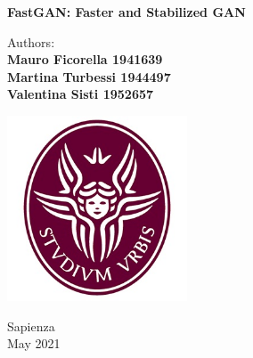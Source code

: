 \documentclass[12pt]{article}
\begin{document}
\begin{titlepage}
	\begin{center}
		\vspace*{1cm}
		
		\Huge
		\textbf{FastGAN: Faster and Stabilized GAN}
		\vspace{1.5cm}
		
		\Large
		Authors:\\
		\textbf{Mauro Ficorella 1941639}\\
		\textbf{Martina Turbessi 1944497}\\
		\textbf{Valentina Sisti 1952657}\\
		\vspace{0.5cm}
		
		\vfill
		
		\includegraphics[width=0.4\textwidth]{Images/Logo.jpg}
		
		\vfill
		
		\vspace{0.8cm}
		
		\Large
		Sapienza\\
		May 2021
	\end{center}
\end{titlepage}


\newpage
\pagestyle{fancy}
\fancyhf{}
\fancyfoot[R]{\thepage}

\end{document}
